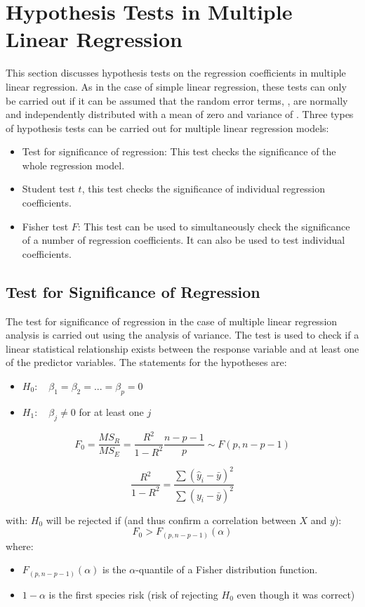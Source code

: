 \documentclass[a4paper]{article}
\theoremstyle{plain}
\begin{document}
\pagebreak
\section{Hypothesis Tests in Multiple Linear Regression}

This section discusses hypothesis tests on the regression coefficients in multiple linear regression. As in the case of simple linear regression, these tests can only be carried out if it can be assumed that the random error terms, , are normally and independently distributed with a mean of zero and variance of . Three types of hypothesis tests can be carried out for multiple linear regression models:

\begin{itemize}
\item Test for significance of regression: This test checks the significance of the whole regression model.
\item Student test $t$, this test checks the significance of individual regression coefficients.
\item Fisher test $F$: This test can be used to simultaneously check the significance of a number of regression coefficients. It can also be used to test individual coefficients. 
\end{itemize}
    
\subsection{Test for Significance of Regression}

The test for significance of regression in the case of multiple linear regression analysis is carried out using the analysis of variance. The test is used to check if a linear statistical relationship exists between the response variable and at least one of the predictor variables. The statements for the hypotheses are: 

\begin{itemize}
\item $H_0: \quad \beta_1 = \beta_2 = ... = \beta_p = 0$
\item $H_1: \quad \beta_j \neq 0$ for at least one $j$
\end{itemize}

$$F_0 = \frac{MS_R}{MS_E}=\frac{R^2}{1-R^2} \frac{n-p-1}{p} \sim F(p,n-p-1)$$

$$ \frac{R^2}{1-R^2} = 
\frac{\sum (\hat y_i - \bar y)^2}{\sum (y_i -\bar y)^2 }
$$

with:
$H_0$ will be rejected if (and thus confirm a correlation between $X$ and $y$):
$$F_0 > F_{(p,n-p-1)}(\alpha) $$
where:
\begin{itemize}
\item $F_{(p,n-p-1)}(\alpha)$ is the $\alpha$-quantile of a Fisher distribution function.
\item $1- \alpha$ is the first species risk (risk of rejecting $H_0$ even though it was correct)
\end{itemize}
 
\end{document}
